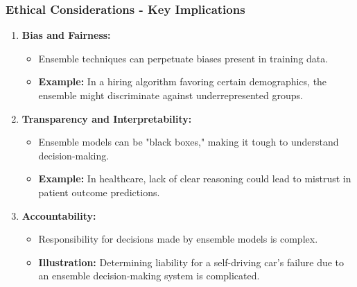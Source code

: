 \documentclass[aspectratio=169]{beamer}
\begin{document}
\begin{frame}[fragile]
    \frametitle{Ethical Considerations - Key Implications}
    \begin{enumerate}
        \item \textbf{Bias and Fairness:}
            \begin{itemize}
                \item Ensemble techniques can perpetuate biases present in training data.\newline
                \item \textbf{Example:} In a hiring algorithm favoring certain demographics, the ensemble might discriminate against underrepresented groups.
            \end{itemize}
    
        \item \textbf{Transparency and Interpretability:}
            \begin{itemize}
                \item Ensemble models can be "black boxes," making it tough to understand decision-making.\newline
                \item \textbf{Example:} In healthcare, lack of clear reasoning could lead to mistrust in patient outcome predictions.
            \end{itemize}
    
        \item \textbf{Accountability:}
            \begin{itemize}
                \item Responsibility for decisions made by ensemble models is complex.\newline
                \item \textbf{Illustration:} Determining liability for a self-driving car's failure due to an ensemble decision-making system is complicated.
            \end{itemize}
    \end{enumerate}
\end{frame}
\end{document}
